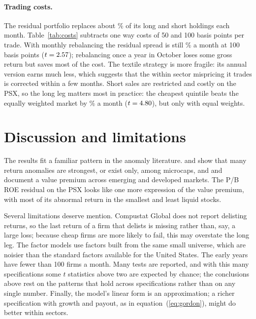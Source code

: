 \documentclass[11pt]{article}
\begin{document}
\paragraph{Trading costs.} The residual portfolio replaces about \Turn\% of its long and short
holdings each month. Table~\ref{tab:costs} subtracts one way costs of 50 and 100 basis points per
trade. With monthly rebalancing the residual spread is still \NetHundred{}\% a month at 100 basis
points ($t = 2.57{}$); rebalancing once a year in October loses some gross return but saves
most of the cost. The textile strategy is more fragile: its annual version earns much less, which
suggests that the within sector mispricing it trades is corrected within a few months. Short sales
are restricted and costly on the PSX, so the long leg matters most in practice: the cheapest
quintile beats the equally weighted market by \TopEx\% a month ($t = 4.80{}$), but only with equal weights.

\begin{table}[htbp]
\centering\small
\caption{Net long short returns after trading costs, percent per month, Newey and West $t$ statistics
in parentheses. Costs are one way, charged on each name bought or sold. Annual portfolios are formed
at the end of October and held for twelve months.}
\label{tab:costs}

\end{table}


\section{Discussion and limitations}\label{sec:discussion}

The results fit a familiar pattern in the anomaly literature. \citet{famafrench2008} and
\citet{houxuezhang2020} show that many return anomalies are strongest, or exist only, among microcaps,
and \citet{rouwenhorst1999} and \citet{asnessmoskowitzpedersen2013} document a value premium across
emerging and developed markets. The P/B ROE residual on the PSX looks like one more expression of the
value premium, with most of its abnormal return in the smallest and least liquid stocks.

Several limitations deserve mention. Compustat Global does not report delisting returns, so the
last return of a firm that delists is missing rather than, say, a large loss; because cheap firms
are more likely to fail, this may overstate the long leg. The factor models use factors built from
the same small universe, which are noisier than the standard factors available for the United States.
The early years have fewer than 100 firms a month. Many tests are reported, and with this many
specifications some $t$ statistics above two are expected by chance; the conclusions above rest on
the patterns that hold across specifications rather than on any single number. Finally, the model's
linear form is an approximation; a richer specification with growth and payout, as in
equation~(\ref{eq:gordon}), might do better within sectors.
\end{document}
